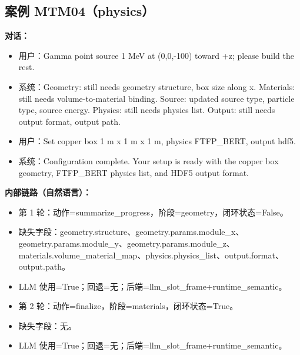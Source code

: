 \documentclass[11pt]{ctexart}
\begin{document}
\subsection{案例 MTM04（physics）}
\textbf{对话：}
\begin{itemize}
\item 用户：Gamma point source 1 MeV at (0,0,-100) toward +z; please build the rest.
\item 系统：Geometry: still needs geometry structure, box size along x. Materials: still needs volume-to-material binding. Source: updated source type, particle type, source energy. Physics: still needs physics list. Output: still needs output format, output path.
\item 用户：Set copper box 1 m x 1 m x 1 m, physics FTFP\_BERT, output hdf5.
\item 系统：Configuration complete. Your setup is ready with the copper box geometry, FTFP\_BERT physics list, and HDF5 output format.
\end{itemize}
\textbf{内部链路（自然语言）：}
\begin{itemize}
\item 第 1 轮：动作=summarize\_progress，阶段=geometry，闭环状态=False。
\item 缺失字段：geometry.structure、geometry.params.module\_x、geometry.params.module\_y、geometry.params.module\_z、materials.volume\_material\_map、physics.physics\_list、output.format、output.path。
\item LLM 使用=True；回退=无；后端=llm\_slot\_frame+runtime\_semantic。
\item 第 2 轮：动作=finalize，阶段=materials，闭环状态=True。
\item 缺失字段：无。
\item LLM 使用=True；回退=无；后端=llm\_slot\_frame+runtime\_semantic。
\end{itemize}
\end{document}
